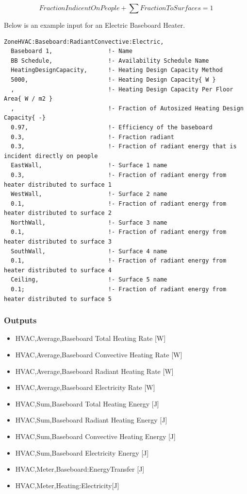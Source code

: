\begin{equation}
FractionIndicentOnPeople + \sum {FractionToSurfaces = 1}
\end{equation}

Below is an example input for an Electric Baseboard Heater.

\begin{lstlisting}
ZoneHVAC:Baseboard:RadiantConvective:Electric,
  Baseboard 1,                !- Name
  BB Schedule,                !- Availability Schedule Name
  HeatingDesignCapacity,      !- Heating Design Capacity Method
  5000,                       !- Heating Design Capacity{ W }
  ,                           !- Heating Design Capacity Per Floor Area{ W / m2 }
  ,                           !- Fraction of Autosized Heating Design Capacity{ -}
  0.97,                       !- Efficiency of the baseboard
  0.3,                        !- Fraction radiant
  0.3,                        !- Fraction of radiant energy that is incident directly on people
  EastWall,                   !- Surface 1 name
  0.3,                        !- Fraction of radiant energy from heater distributed to surface 1
  WestWall,                   !- Surface 2 name
  0.1,                        !- Fraction of radiant energy from heater distributed to surface 2
  NorthWall,                  !- Surface 3 name
  0.1,                        !- Fraction of radiant energy from heater distributed to surface 3
  SouthWall,                  !- Surface 4 name
  0.1,                        !- Fraction of radiant energy from heater distributed to surface 4
  Ceiling,                    !- Surface 5 name
  0.1;                        !- Fraction of radiant energy from heater distributed to surface 5
\end{lstlisting}

\subsubsection{Outputs}\label{outputs-2-017}

\begin{itemize}
\item
  HVAC,Average,Baseboard Total Heating Rate {[}W{]}
\item
  HVAC,Average,Baseboard Convective Heating Rate {[}W{]}
\item
  HVAC,Average,Baseboard Radiant Heating Rate {[}W{]}
\item
  HVAC,Average,Baseboard Electricity Rate {[}W{]}
\item
  HVAC,Sum,Baseboard Total Heating Energy {[}J{]}
\item
  HVAC,Sum,Baseboard Radiant Heating Energy {[}J{]}
\item
  HVAC,Sum,Baseboard Convective Heating Energy {[}J{]}
\item
  HVAC,Sum,Baseboard Electricity Energy {[}J{]}
\item
  HVAC,Meter,Baseboard:EnergyTransfer {[}J{]}
\item
  HVAC,Meter,Heating:Electricity{[}J{]}
\end{itemize}

